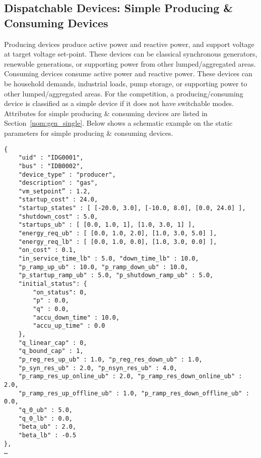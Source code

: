 \subsection{Dispatchable Devices: Simple Producing \& Consuming Devices}
\label{sec:generator}
Producing devices
produce active power and reactive power, and support voltage at target voltage set-point.
These devices can be classical synchronous generators, renewable generations, or supporting 
power from other lumped/aggregated areas. 
Consuming devices consume active power and reactive power.
These devices can be household demands, industrial loads, pump storage, or
supporting power to other lumped/aggregated areas. 
For the competition, a producing/consuming device is classified as a simple device if it
does not have switchable modes.
Attributes for simple producing \& consuming devices are listed in Section~\ref{nom:gen_single}.
Below shows a schematic example on the static parameters for simple producing \& consuming devices.

\begin{verbatim}
{
    "uid" : "IDG0001",
    "bus" : "IDB0002",
    "device_type" : "producer",
    "description" : "gas",
    "vm_setpoint” : 1.2,
    "startup_cost" : 24.0,
    "startup_states" : [ [-20.0, 3.0], [-10.0, 8.0], [0.0, 24.0] ], 
    "shutdown_cost" : 5.0,
    "startups_ub" : [ [0.0, 1.0, 1], [1.0, 3.0, 1] ],
    "energy_req_ub" : [ [0.0, 1.0, 2.0], [1.0, 3.0, 5.0] ],
    "energy_req_lb" : [ [0.0, 1.0, 0.0], [1.0, 3.0, 0.0] ],
    "on_cost" : 0.1,
    "in_service_time_lb" : 5.0, "down_time_lb" : 10.0,
    "p_ramp_up_ub" : 10.0, "p_ramp_down_ub" : 10.0, 
    "p_startup_ramp_ub" : 5.0, "p_shutdown_ramp_ub" : 5.0,
    "initial_status": {
        "on_status": 0,
        "p" : 0.0,
        "q" : 0.0,
        "accu_down_time" : 10.0,
        "accu_up_time" : 0.0
    },
    "q_linear_cap" : 0, 
    "q_bound_cap" : 1, 
    "p_reg_res_up_ub" : 1.0, "p_reg_res_down_ub" : 1.0,
    "p_syn_res_ub" : 2.0, "p_nsyn_res_ub" : 4.0, 
    "p_ramp_res_up_online_ub" : 2.0, "p_ramp_res_down_online_ub" : 2.0,
    "p_ramp_res_up_offline_ub" : 1.0, "p_ramp_res_down_offline_ub" : 0.0,
    "q_0_ub" : 5.0,
    "q_0_lb" : 0.0,
    "beta_ub" : 2.0,
    "beta_lb" : -0.5    
},
…     
\end{verbatim}



